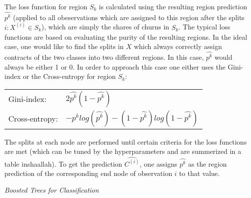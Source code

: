\documentclass[12pt,titlepage]{article}
\begin{document}
The loss function for region $S_{k}$ is calculated using the resulting region prediction $\widehat{p^{k}}$ (applied to all obeservations which are assigned to this region after the splits $i:X^{(i)}\in S_{k}$), which are simply the shares of churns in $S_{k}$. The typical loss functions are based on evaluating the purity of the resulting regions. In the ideal case, one would like to find the splits in $X$ which always correctly assign contracts of the two classes into two different regions. In this case, $\widehat{p^{k}}$ would always be either 1 or 0. In order to approach this case one either uses the Gini-index or the Cross-entropy for region $S_{k}$: \\

\begin{center}
    \begin{tabular}{ll}
        Gini-index: & $2\widehat{p^{k}}(1-\widehat{p^{k}})$ \\
        Cross-entropy: & $-\widehat{p^{k}}log(\widehat{p^{k}}) - (1-\widehat{p^{k}})log(1-\widehat{p^{k}})$ \\
    \end{tabular}
\end{center}

The splits at each node are performed until certain criteria for the loss functions are met (which can be tuned by the hyperparameters and are summerized in a table inshaallah). To get the prediction $\widehat{C^{(i)}}$, one assigns $\widehat{p^{k}}$ as the region prediction of the corresponding end node of observation $i$ to that value.

\textit{Boosted Trees for Classification}
\end{document}
